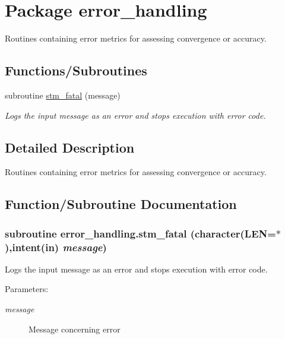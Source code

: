 \hypertarget{a00057}{
\section{Package error\_\-handling}
\label{a00057}
}
Routines containing error metrics for assessing convergence or accuracy.  


\subsection*{Functions/Subroutines}
\begin{CompactItemize}
\item 
subroutine \hyperlink{a00057_b4a724ed13db0e2d22fc954f21f1f356}{stm\_\-fatal} (message)
\begin{CompactList}\small\item\em Logs the input message as an error and stops execution with error code. \item\end{CompactList}\end{CompactItemize}


\subsection{Detailed Description}
Routines containing error metrics for assessing convergence or accuracy. 



\subsection{Function/Subroutine Documentation}
\hypertarget{a00057_b4a724ed13db0e2d22fc954f21f1f356}{
\subsubsection[{stm\_\-fatal}]{\setlength{\rightskip}{0pt plus 5cm}subroutine error\_\-handling.stm\_\-fatal (character(LEN=$\ast$),intent(in) {\em message})}}
\label{a00057_b4a724ed13db0e2d22fc954f21f1f356}


Logs the input message as an error and stops execution with error code. 

\begin{Desc}
\item[Parameters:]
\begin{description}
\item[{\em message}]Message concerning error \end{description}
\end{Desc}
